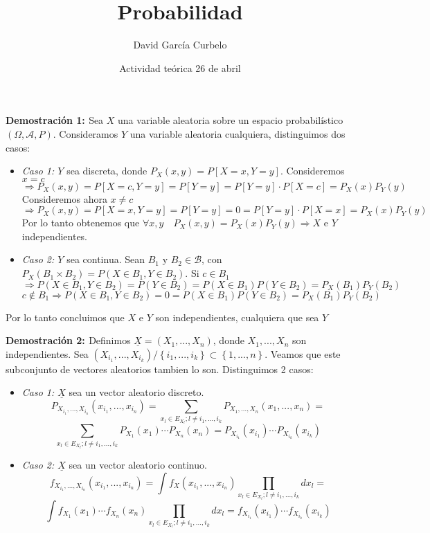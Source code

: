 \documentclass[a4paper, 12pt]{article}
\author{David García Curbelo}
\title{Probabilidad}
\date{Actividad teórica 26 de abril}
\begin{document}
    \maketitle
    \setcounter{page}{1}
    \pagestyle{plain}

    {\bf{Demostración 1: }}
    Sea $X$ una variable aleatoria sobre un espacio probabilístico $\left(\Omega,\mathcal{A}, P\right)$.
    Consideramos $Y$ una variable aleatoria cualquiera, distinguimos dos casos:
    \begin{itemize}
        \item {\it{Caso 1: }} $Y$ sea discreta, donde $P_X(x,y)=P[X=x, Y=y]$. Consideremos $x=c$
        $$\Rightarrow P_X(x,y)=P[X=c, Y=y] = P[Y=y] = P[Y=y]\cdot P[X=c] = P_X(x)P_Y(y)$$
        Consideremos ahora $x \neq c$
        $$\Rightarrow P_X(x,y)=P[X=x, Y=y] = P[Y=y] = 0 = P[Y=y]\cdot P[X=x] = P_X(x)P_Y(y)$$
        Por lo tanto obtenemos que $\forall x,y \quad P_X(x,y)=P_X(x)P_Y(y)\Rightarrow X$ e $Y$ independientes.

        \item {\it{Caso 2: }} $Y$ sea continua. Sean $B_1$ y $B_2 \in \mathcal{B}$,
        con $P_X(B_1 \times B_2)=P(X \in B_1,Y \in B_2)$. Si $c\in B_1$
        $$\Rightarrow P(X \in B_1,Y \in B_2) = P(Y \in B_2)=P(X\in B_1)P(Y \in B_2)=P_X(B_1)P_Y(B_2)$$
        $$c \not\in B_1 \Rightarrow P(X \in B_1,Y \in B_2) = 0 = P(X\in B_1)P(Y \in B_2)=P_X(B_1)P_Y(B_2)$$
    \end{itemize}
    Por lo tanto concluimos que $X$ e $Y$ son independientes, cualquiera que sea $Y$

    \newpage

    {\bf{Demostración 2: }}
    Definimos $\underline{X}=(X_1,...,X_n)$, donde $X_1,...,X_n$ son independientes.
    Sea $(X_{i_1},...,X_{i_k})/\left\{i_1,...,i_k\right\} \subset \left\{1,...,n\right\}$.
    Veamos que este subconjunto de vectores aleatorios tambien lo son. Distinguimos 2 casos:

    \begin{itemize}
        \item {\it{Caso 1: }} $\underline{X}$ sea un vector aleatorio discreto.
        $$P_{X_{i_1},...,X_{i_n}}(x_{i_1},...,x_{i_n})=\sum _{x_l \in E_{X_l}; l\neq i_1,...,i_k} 
        P_{X_{1},...,X_{n}}(x_{1},...,x_{n})=
        $$$$\sum _{x_l \in E_{X_l}; l\neq i_1,...,i_k} 
        P_{X_1}(x_1)\cdots P_{X_n}(x_n)= P_{X_{i_1}}(x_{i_1})\cdots P_{X_{i_k}}(x_{i_k})$$
        \item {\it{Caso 2: }} $\underline{X}$ sea un vector aleatorio continuo.
        $$f_{X_{i_1},...,X_{i_n}}(x_{i_1},...,x_{i_n})=\int f_X(x_{i_1},...,x_{i_n}) \prod _{x_l \in E_{X_l}; l\neq i_1,...,i_k}dx_l=
        $$$$\int f_{X_1}(x_1) \cdots f_{X_n}(x_n) \prod _{x_l \in E_{X_l}; l\neq i_1,...,i_k}dx_l=
        f_{X_{i_1}}(x_{i_1})\cdots f_{X_{i_k}}(x_{i_k})$$
    \end{itemize}
\end{document}
